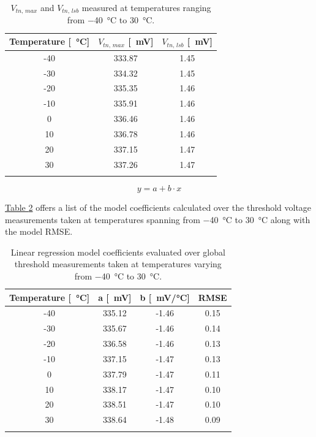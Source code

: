 \begin{table}[ht]
    \centering
    \begin{tabular}{c c c} 
        \Xhline{2\arrayrulewidth}
        Temperature [\SI{}{\celsius}] & $V_{\textit{tn, max}}$ [\SI{}{\milli\volt}] & $V_{\textit{tn, lsb}}$ [\SI{}{\milli\volt}] \T\B \\
        \hline
        -40 & 333.87 & 1.45 \T\B \\
        -30 & 334.32 & 1.45 \T\B \\
        -20 & 335.35 & 1.46 \T\B \\
        -10 & 335.91 & 1.46 \T\B \\
        0 & 336.46 & 1.46 \T\B \\
        10 & 336.78 & 1.46 \T\B \\
        20 & 337.15 & 1.47 \T\B \\
        30 & 337.26 & 1.47 \T\B \\
        \Xhline{2\arrayrulewidth}
    \end{tabular}
    \caption{$V_{\textit{tn, max}}$ and $V_{\textit{tn, lsb}}$ measured at temperatures ranging from \SI{-40}{\celsius} to \SI{30}{\celsius}.}
    \label{tabDACmaxlsb}
\end{table}

\begin{equation}
    y = a + b \cdot x
\label{DAClinearmodel}
\end{equation}

\hyperref[tabDAClinearmodel1]{Table \ref{tabDAClinearmodel1}} offers a list of the model coefficients calculated over the threshold voltage measurements taken at temperatures spanning from \SI{-40}{\celsius} to \SI{30}{\celsius} along with the model RMSE.

\begin{table}[ht]
    \centering
    \begin{tabular}{c c c c} 
        \Xhline{2\arrayrulewidth}
        Temperature [\SI{}{\celsius}] & a [\SI{}{\milli\volt}] & b [\SI{}{\milli\volt/\celsius}] & RMSE \T\B \\
        \hline
        -40 & 335.12 & -1.46 & 0.15 \T\B \\
        -30 & 335.67 & -1.46 & 0.14 \T\B \\
        -20 & 336.58 & -1.46 & 0.13 \T\B \\
        -10 & 337.15 & -1.47 & 0.13 \T\B \\
        0 & 337.79 & -1.47 & 0.11 \T\B \\
        10 & 338.17 & -1.47 & 0.10 \T\B \\
        20 & 338.51 & -1.47 & 0.10 \T\B \\
        30 & 338.64 & -1.48 & 0.09 \T\B \\
        \Xhline{2\arrayrulewidth}
    \end{tabular}
    \caption{Linear regression model coefficients evaluated over global threshold measurements taken at temperatures varying from \SI{-40}{\celsius} to \SI{30}{\celsius}.}
    \label{tabDAClinearmodel1}
\end{table}

